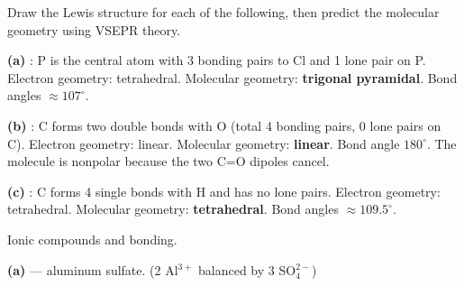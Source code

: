 \documentclass[addpoints]{exam}
\begin{document}
\begin{questions}
\question Draw the Lewis structure for each of the following, then predict the molecular
geometry using VSEPR theory.
\begin{solution}[9cm]
\textbf{(a)} : P is the central atom with 3 bonding pairs to Cl and 1 lone pair on P.
Electron geometry: tetrahedral. Molecular geometry: \textbf{trigonal pyramidal}. Bond angles
$\approx 107^\circ$.

\textbf{(b)} : C forms two double bonds with O (total 4 bonding pairs, 0 lone pairs
on C). Electron geometry: linear. Molecular geometry: \textbf{linear}. Bond angle $180^\circ$.
The molecule is nonpolar because the two C=O dipoles cancel.

\textbf{(c)} : C forms 4 single bonds with H and has no lone pairs. Electron geometry:
tetrahedral. Molecular geometry: \textbf{tetrahedral}. Bond angles $\approx 109.5^\circ$.
\end{solution}

\question Ionic compounds and bonding.
\begin{solution}[9cm]
\textbf{(a)}  — aluminum sulfate. (2 Al$^{3+}$ balanced by 3 SO$_4^{2-}$)


\end{solution}
\end{questions}
\end{document}

